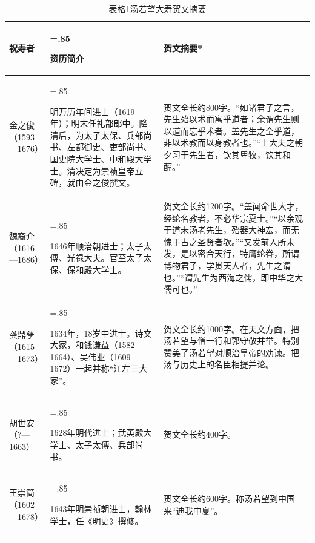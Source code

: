 \begin{table}[!htbp]\label{table-57}
\centering\BookTableStyle
\caption*{表格1\quad 汤若望大寿贺文摘要}
\begin{tabularx}{\linewidth}{>{\centering\arraybackslash}p{24mm}|>{\hsize=.85\hsize\raggedright\arraybackslash}X|>{\hsize=1.15\hsize\raggedright\arraybackslash}X}
\hline
祝寿者 & 资历简介 & 贺文摘要* \\ \hline
金之俊\newline （1593—1676） & 明万历年间进士（1619年）；明末任礼部郎中。降清后，为太子太保、兵部尚书、左都御史、吏部尚书、国史院大学士、中和殿大学士。清决定为崇祯皇帝立碑，就由金之俊撰文。 & 贺文全长约800字。“如诸君子之言，先生殆以术而寓乎道者；余谓先生则以道而忘乎术者。盖先生之全乎道，非以术教而以身教者也。”“士大夫之朝夕习于先生者，钦其卑牧，饮其和醇。” \\ \hline
魏裔介\newline （1616—1686） & 1646年顺治朝进士；太子太傅、光禄大夫。官至太子太保、保和殿大学士。 & 贺文全长约1200字。“盖闻命世大才，经纶名教者，不必华宗夏士。”“以余观于道未汤老先生，殆器大神宏，而无愧于古之圣贤者欤。”“又发前人所未发，是以密合天行，特膺纶眷，所谓博物君子，学贯天人者，先生之谓也。”“谓先生为西海之儒，即中华之大儒可也。” \\ \hline
龚鼎孳\newline （1615—1673） & 1634年，18岁中进士。诗文大家，和钱谦益（1582—1664）、吴伟业（1609—1672）一起并称“江左三大家”。 & 贺文全长约1000字。在天文方面，把汤若望与僧一行和郭守敬并举。特别赞美了汤若望对顺治皇帝的劝谏。把汤与历史上的名臣相提并论。 \\ \hline
胡世安\newline （?—1663） & 1628年明代进士；武英殿大学士、太子太傅、兵部尚书。 & 贺文全长约400字。 \\ \hline
王崇简\newline （1602—1678） & 1643年明崇祯朝进士，翰林学士，任《明史》撰修。 & 贺文全长约600字。称汤若望到中国来“迪我中夏”。 \\ \hline
\end{tabularx}
\end{table}%
